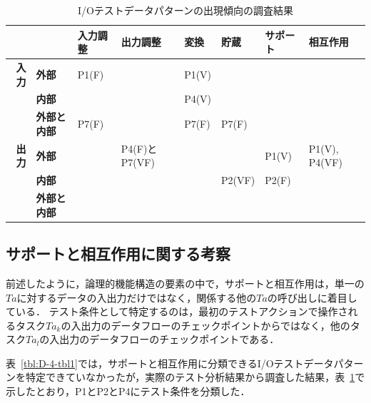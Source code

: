 \begin{table}[htbp]
  \centering
  \caption{I/Oテストデータパターンの出現傾向の調査結果}
    \begin{tabular}{|r|p{4em}|p{4em}|p{4em}|p{3em}|p{3em}|p{4em}|p{4em}|}
    \hline
          & \multicolumn{1}{l|}{} & \multicolumn{1}{p{4em}|}{\textbf{入力調整}} & \multicolumn{1}{p{4em}|}{\textbf{出力調整}} & \multicolumn{1}{p{4em}|}{\textbf{変換}} & \multicolumn{1}{p{4em}|}{\textbf{貯蔵}} & \multicolumn{1}{p{2em}|}{\textbf{サポート}} & \multicolumn{1}{p{1.915em}|}{\textbf{相互作用}} \bigstrut\\
    \hline
    \multicolumn{1}{|p{1.5em}|}{\textbf{入力}} & \textbf{外部} & P1(F) &       & P1(V) &       &       &  \bigstrut\\
\cline{2-8}          & \textbf{内部} &       &       & P4(V) &       &       &  \bigstrut\\
\cline{2-8}          & \textbf{外部と内部} & \multicolumn{1}{p{4em}|}{P7(F)} &       & \multicolumn{1}{p{4em}|}{P7(F)} & \multicolumn{1}{p{4em}|}{P7(F)} &       &  \bigstrut\\
    \hline
    \multicolumn{1}{|p{1.5em}|}{\textbf{出力}} & \textbf{外部} &       & P4(F)とP7(VF) &       &       & P1(V) & \multicolumn{1}{|p{3em}|}{P1(V), P4(VF)} \bigstrut\\
\cline{2-8}          & \textbf{内部} &       &       &       & \multicolumn{1}{p{4em}|}{P2(VF)} & P2(F) &  \bigstrut\\
\cline{2-8}\cline{8-8}          & \textbf{外部と内部} &       &       &       &       &       &  \bigstrut\\
    \hline
    \end{tabular}%
  \label{tab:addlabel-3}%
\end{table}%

\subsection{サポートと相互作用に関する考察}
前述したように，論理的機能構造の要素の中で，サポートと相互作用は，単一の$Ta$に対するデータの入出力だけではなく，関係する他の$Ta$の呼び出しに着目している．
テスト条件として特定するのは，最初のテストアクションで操作されるタスク$Ta_k$の入出力のデータフローのチェックポイントからではなく，他のタスク$Ta_l$の入出力のデータフローのチェックポイントである．

表~\ref{tbl:D-4-tbl1}では，サポートと相互作用に分類できるI/Oテストデータパターンを特定できていなかったが，実際のテスト分析結果から調査した結果，表~\ref{tab:addlabel-3}で示したとおり，P1とP2とP4にテスト条件を分類した．

